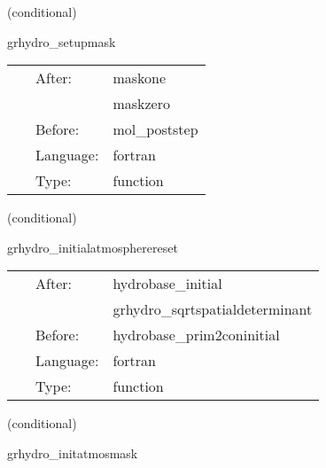 \documentclass{article}
\begin{document}
\vspace{5mm}

   (conditional) 

\hspace{5mm} grhydro\_setupmask 

\hspace{5mm}{\it initialize the atmosphere mask } 


\hspace{5mm}

 \begin{tabular*}{160mm}{cll} 
~ & After:  & maskone \\ 
~& ~ &maskzero\\ 
~ & Before:  & mol\_poststep \\ 
~ & Language:  & fortran \\ 
~ & Type:  & function \\ 
\end{tabular*} 


\vspace{5mm}

   (conditional) 

\hspace{5mm} grhydro\_initialatmospherereset 

\hspace{5mm}{\it use mask to enforce atmosphere at initial time } 


\hspace{5mm}

 \begin{tabular*}{160mm}{cll} 
~ & After:  & hydrobase\_initial \\ 
~& ~ &grhydro\_sqrtspatialdeterminant\\ 
~ & Before:  & hydrobase\_prim2coninitial \\ 
~ & Language:  & fortran \\ 
~ & Type:  & function \\ 
\end{tabular*} 


\vspace{5mm}

   (conditional) 

\hspace{5mm} grhydro\_initatmosmask 

\hspace{5mm}{\it set the atmosphere mask } 


\hspace{5mm}
\end{document}
